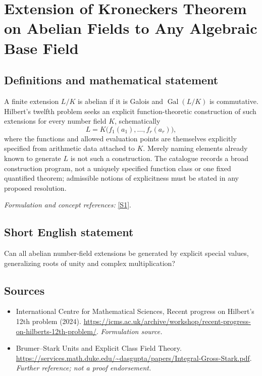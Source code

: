 \documentclass[11pt]{article}
\begin{document}
\section*{\texorpdfstring{Extension of Kroneckers Theorem on Abelian Fields to Any Algebraic Base Field}{Extension of Kroneckers Theorem on Abelian Fields to Any Algebraic Base Field}}\label{36}
\subsection{Definitions and mathematical statement}
A finite extension $L/K$ is abelian if it is Galois and $\operatorname{Gal}(L/K)$ is commutative. Hilbert's twelfth problem seeks an explicit function-theoretic construction of such extensions for every number field $K$, schematically
\[
 L=K\bigl(f_1(a_1),\ldots,f_r(a_r)\bigr),
\]
where the functions and allowed evaluation points are themselves explicitly specified from arithmetic data attached to $K$. Merely naming elements already known to generate $L$ is not such a construction. The catalogue records a broad construction program, not a uniquely specified function class or one fixed quantified theorem; admissible notions of explicitness must be stated in any proposed resolution.
\par\smallskip\textit{Formulation and concept references:} \href{https://icms.ac.uk/archive/workshop/recent-progress-on-hilberts-12th-problem/}{[S1]}.

\subsection{Short English statement}
Can all abelian number-field extensions be generated by explicit special values, generalizing roots of unity and complex multiplication?
\subsection{Sources}
\begin{itemize}
\item[S1]International Centre for Mathematical Sciences, Recent progress on Hilbert's 12th problem (2024).
\url{https://icms.ac.uk/archive/workshop/recent-progress-on-hilberts-12th-problem/}.
\textit{Formulation source.}
\item[S2]Brumer–Stark Units and Explicit Class Field Theory.
\url{https://services.math.duke.edu/~dasgupta/papers/Integral-Gross-Stark.pdf}.
\textit{Further reference; not a proof endorsement.}
\end{itemize}
\end{document}
